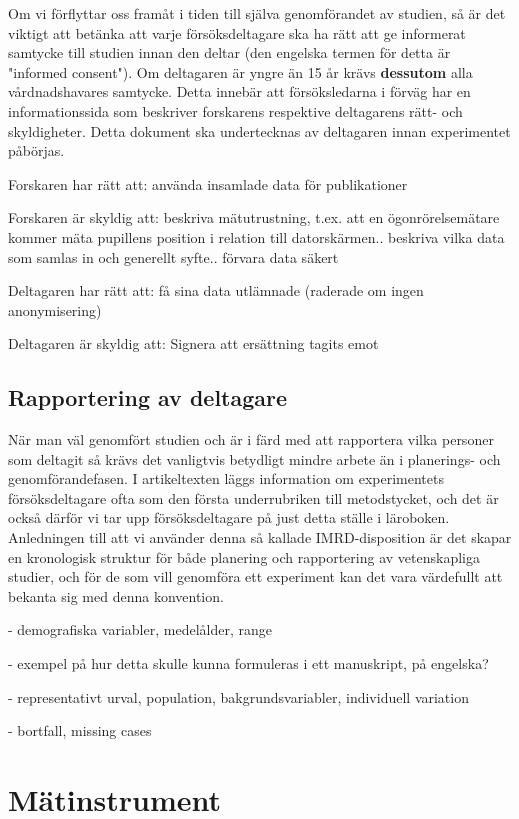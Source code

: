 \documentclass[
]{book}
\begin{document}
Om vi förflyttar oss framåt i tiden till själva genomförandet av studien, så är det viktigt att betänka att varje försöksdeltagare ska ha rätt att ge informerat samtycke till studien innan den deltar (den engelska termen för detta är "informed consent"). Om deltagaren är yngre än 15 år krävs \textbf{dessutom} alla vårdnadshavares samtycke. Detta innebär att försöksledarna i förväg har en informationssida som beskriver forskarens respektive deltagarens rätt- och skyldigheter. Detta dokument ska undertecknas av deltagaren innan experimentet påbörjas.

Forskaren har rätt att: använda insamlade data för publikationer

Forskaren är skyldig att: beskriva mätutrustning, t.ex. att en ögonrörelsemätare kommer mäta pupillens position i relation till datorskärmen.. beskriva vilka data som samlas in och generellt syfte.. förvara data säkert

Deltagaren har rätt att: få sina data utlämnade (raderade om ingen anonymisering)

Deltagaren är skyldig att: Signera att ersättning tagits emot

\hypertarget{sub07.2.6}{%
\subsection{Rapportering av deltagare}\label{sub07.2.6}}

När man väl genomfört studien och är i färd med att rapportera vilka personer som deltagit så krävs det vanligtvis betydligt mindre arbete än i planerings- och genomförandefasen. I artikeltexten läggs information om experimentets försöksdeltagare ofta som den första underrubriken till metodstycket, och det är också därför vi tar upp försöksdeltagare på just detta ställe i läroboken. Anledningen till att vi använder denna så kallade IMRD-disposition är det skapar en kronologisk struktur för både planering och rapportering av vetenskapliga studier, och för de som vill genomföra ett experiment kan det vara värdefullt att bekanta sig med denna konvention.

- demografiska variabler, medelålder, range

- exempel på hur detta skulle kunna formuleras i ett manuskript, på engelska?

- representativt urval, population, bakgrundsvariabler, individuell variation

- bortfall, missing cases

\hypertarget{sec07.3}{%
\section{Mätinstrument}\label{sec07.3}}
\end{document}
